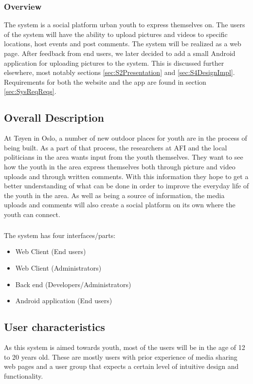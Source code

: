 \subsubsection*{Overview}
The system is a social platform urban youth to express themselves on. The users of the system will have the ability to upload pictures and videos to specific locations, host events and post comments. The system will be realized as a web page. After feedback from end users, we later decided to add a small Android application for uploading pictures to the system. This is discussed further elsewhere, most notably sections \ref{sec:S2Presentation} and \ref{sec:S4DesignImpl}. Requirements for both the website and the app are found in section \ref{sec:SysReqReqs}.

\subsection{Overall Description}
\label{subsec:SysReqIntroDescr}

At T\o yen in Oslo, a number of new outdoor places for youth are in the process of being built. As a part of that process, the researchers at AFI and the local politicians in the area wants input from the youth themselves. They want to see how the youth in the area express themselves both through picture and video uploads and through written comments. With this information they hope to get a better understanding of what can be done in order to improve the everyday life of the youth in the area. As well as being a source of information, the media uploads and comments will also create a social platform on its own where the youth can connect.
\subparagraph{} The system has four interfaces/parts:
\begin{itemize}
    \item Web Client (End users)
    \item Web Client (Administrators)
    \item Back end (Developers/Administrators)
    \item Android application (End users)
\end{itemize}

\subsection{User characteristics}
\label{subsec:SysReqIntroUserChar}

As this system is aimed towards youth, most of the users will be in the age of 12 to 20 years old. These are mostly users with prior experience of media sharing web pages and a user group that expects a certain level of intuitive design and functionality.

